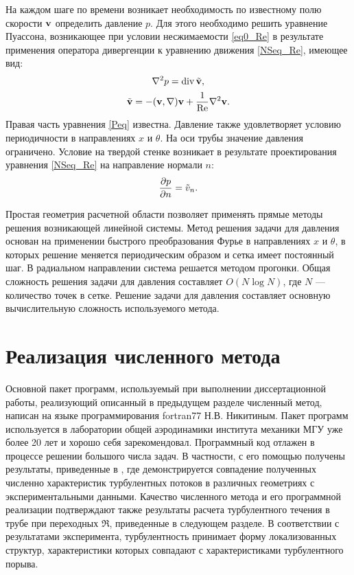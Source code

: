 На каждом шаге по времени возникает необходимость по известному полю скорости $\mathbf{v}$ определить давление $p$. Для этого необходимо решить уравнение Пуассона, возникающее при условии несжимаемости \eqref{eq0_Re} в результате применения оператора дивергенции к уравнению движения \eqref{NSeq_Re}, имеющее вид:
\begin{equation}\label{Peq}
\nabla^2 p = \operatorname{div} \tilde {\mathbf{v}},
\end{equation}
$$
\tilde {\mathbf{v}} = - (\mathbf{v},\nabla)\mathbf{v} + \frac{1}{\operatorname{Re}}\nabla^2 \mathbf{v}. 
$$
Правая часть уравнения \eqref{Peq} известна. Давление также удовлетворяет условию периодичности в направлениях $x$ и $\theta$. На оси трубы значение давления ограничено. Условие на твердой стенке возникает в результате проектирования уравнения \eqref{NSeq_Re} на направление нормали $n$:
$$
\frac{\partial p}{\partial n} = \tilde v_n.
$$


Простая геометрия расчетной области позволяет применять прямые методы решения возникающей линейной системы. Метод решения задачи для давления основан на применении быстрого преобразования Фурье в направлениях $x$ и $\theta$, в которых решение меняется периодическим образом и сетка имеет постоянный шаг. В радиальном направлении система решается методом прогонки. Общая сложность решения задачи для давления составляет $O(N \log N)$, где $N$ --- количество точек в сетке. Решение задачи для давления составляет основную вычислительную сложность используемого метода. 


\section{Реализация численного метода}

Основной пакет программ, используемый при выполнении диссертационной работы, реализующий описанный в предыдущем разделе численный метод, написан на языке программирования fortran77 Н.В. Никитиным. Пакет программ используется в лаборатории общей аэродинамики института механики МГУ уже более 20 лет и хорошо себя зарекомендовал. Программный код отлажен в процессе решении большого числа задач. В частности, с его помощью получены результаты, приведенные в \cite{Nikitin2006}, где демонстрируется совпадение полученных численно характеристик турбулентных потоков в различных геометриях с экспериментальными данными. Качество численного метода и его программной реализации подтверждают также результаты расчета турбулентного течения в трубе при переходных $\Re$, приведенные в следующем разделе. В соответствии с результатами эксперимента, турбулентность принимает форму локализованных структур, характеристики которых совпадают с характеристиками турбулентного порыва. 

